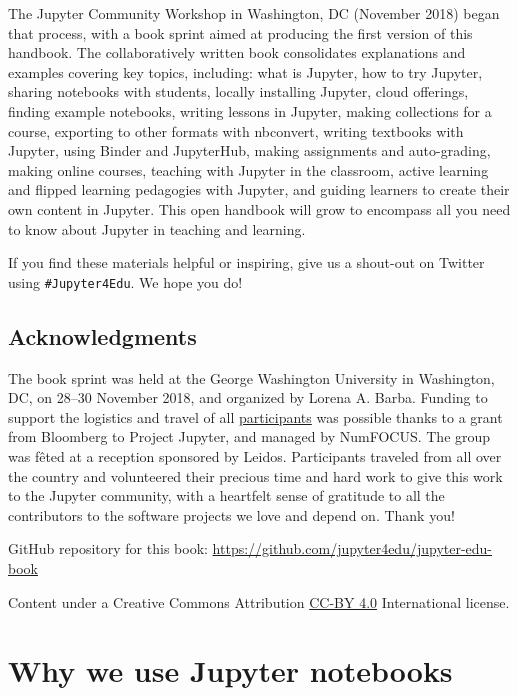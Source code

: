 \documentclass[]{book}
\begin{document}
The Jupyter Community Workshop in Washington, DC (November 2018) began that
process, with a book sprint aimed at producing the first version of this
handbook. The collaboratively written book consolidates explanations and
examples covering key topics, including: what is Jupyter, how to try Jupyter,
sharing notebooks with students, locally installing Jupyter, cloud offerings,
finding example notebooks, writing lessons in Jupyter, making collections for a
course, exporting to other formats with nbconvert, writing textbooks with
Jupyter, using Binder and JupyterHub, making assignments and auto-grading,
making online courses, teaching with Jupyter in the classroom, active learning
and flipped learning pedagogies with Jupyter, and guiding learners to create
their own content in Jupyter. This open handbook will grow to encompass all you
need to know about Jupyter in teaching and learning.

If you find these materials helpful or inspiring, give us a shout-out on Twitter
using \texttt{\#Jupyter4Edu}. We hope you do!

\hypertarget{acknowledgments}{%
\section*{Acknowledgments}\label{acknowledgments}}

The book sprint was held at the George Washington University in Washington, DC,
on 28--30 November 2018, and organized by Lorena A. Barba. Funding to support the
logistics and travel of all \protect\hyperlink{authors}{participants} was possible thanks to a
grant from Bloomberg to Project Jupyter, and managed by NumFOCUS. The group was
fêted at a reception sponsored by Leidos. Participants traveled from all over
the country and volunteered their precious time and hard work to give this work
to the Jupyter community, with a heartfelt sense of gratitude to all the
contributors to the software projects we love and depend on. Thank you!

GitHub repository for this book: \url{https://github.com/jupyter4edu/jupyter-edu-book}

Content under a Creative Commons Attribution \href{https://creativecommons.org/licenses/by/4.0/legalcode}{CC-BY 4.0} International license.

\hypertarget{why-we-use-jupyter-notebooks}{%
\chapter{Why we use Jupyter notebooks}\label{why-we-use-jupyter-notebooks}}
\end{document}
